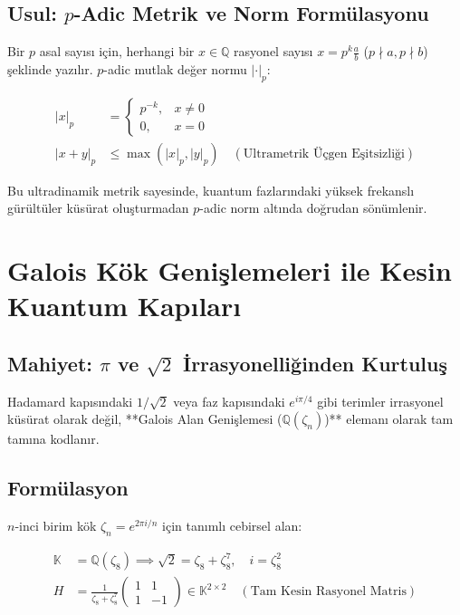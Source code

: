 \documentclass[11pt, a4paper]{article}
\begin{document}
\subsection{Usul: $p$-Adic Metrik ve Norm Formülasyonu}
Bir $p$ asal sayısı için, herhangi bir $x \in \mathbb{Q}$ rasyonel sayısı $x = p^k \frac{a}{b}$ ($p \nmid a, p \nmid b$) şeklinde yazılır. $p$-adic mutlak değer normu $|\cdot|_p$:

\begin{align}
|x|_p &= \begin{cases} p^{-k}, & x \neq 0 \\ 0, & x = 0 \end{cases} \\
|x + y|_p &\le \max(|x|_p, |y|_p) \quad (\text{Ultrametrik Üçgen Eşitsizliği})
\end{align}

Bu ultradinamik metrik sayesinde, kuantum fazlarındaki yüksek frekanslı gürültüler küsürat oluşturmadan $p$-adic norm altında doğrudan sönümlenir.

\section{Galois Kök Genişlemeleri ile Kesin Kuantum Kapıları}

\subsection{Mahiyet: $\pi$ ve $\sqrt{2}$ İrrasyonelliğinden Kurtuluş}
Hadamard kapısındaki $1/\sqrt{2}$ veya faz kapısındaki $e^{i\pi/4}$ gibi terimler irrasyonel küsürat olarak değil, **Galois Alan Genişlemesi ($\mathbb{Q}(\zeta_n)$)** elemanı olarak tam tamına kodlanır.

\subsection{Formülasyon}
$n$-inci birim kök $\zeta_n = e^{2\pi i / n}$ için tanımlı cebirsel alan:

\begin{align}
\mathbb{K} &= \mathbb{Q}(\zeta_8) \implies \sqrt{2} = \zeta_8 + \zeta_8^7, \quad i = \zeta_8^2 \\
H &= \frac{1}{\zeta_8 + \zeta_8^7} \begin{pmatrix} 1 & 1 \\ 1 & -1 \end{pmatrix} \in \mathbb{K}^{2 \times 2} \quad (\text{Tam Kesin Rasyonel Matris})
\end{align}
\end{document}
